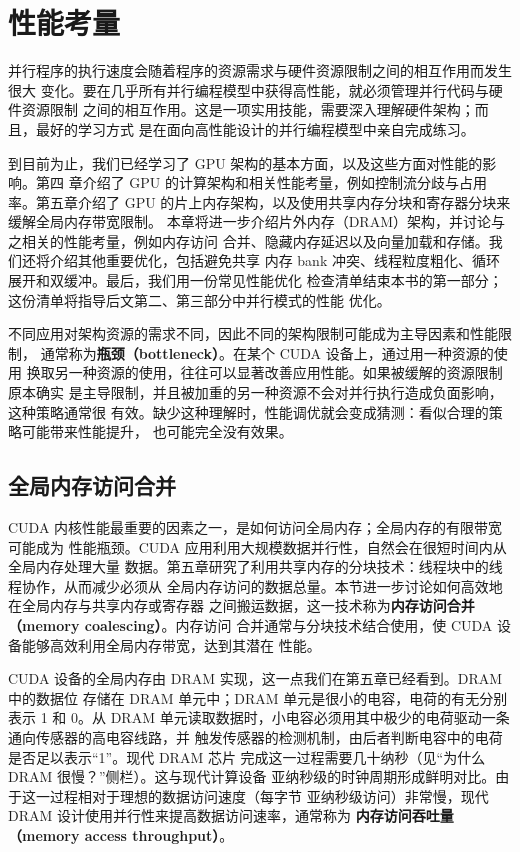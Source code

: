 \chapter{性能考量}
\label{chap:performance-considerations}
\chaptercontents

\setcounter{footnote}{0}

并行程序的执行速度会随着程序的资源需求与硬件资源限制之间的相互作用而发生很大
变化。要在几乎所有并行编程模型中获得高性能，就必须管理并行代码与硬件资源限制
之间的相互作用。这是一项实用技能，需要深入理解硬件架构；而且，最好的学习方式
是在面向高性能设计的并行编程模型中亲自完成练习。

到目前为止，我们已经学习了 GPU 架构的基本方面，以及这些方面对性能的影响。第四
章介绍了 GPU 的计算架构和相关性能考量，例如控制流分歧与占用率。第五章介绍了
GPU 的片上内存架构，以及使用共享内存分块和寄存器分块来缓解全局内存带宽限制。
本章将进一步介绍片外内存（DRAM）架构，并讨论与之相关的性能考量，例如内存访问
合并、隐藏内存延迟以及向量加载和存储。我们还将介绍其他重要优化，包括避免共享
内存 bank 冲突、线程粒度粗化、循环展开和双缓冲。最后，我们用一份常见性能优化
检查清单结束本书的第一部分；这份清单将指导后文第二、第三部分中并行模式的性能
优化。

不同应用对架构资源的需求不同，因此不同的架构限制可能成为主导因素和性能限制，
通常称为\textbf{瓶颈（bottleneck）}。在某个 CUDA 设备上，通过用一种资源的使用
换取另一种资源的使用，往往可以显著改善应用性能。如果被缓解的资源限制原本确实
是主导限制，并且被加重的另一种资源不会对并行执行造成负面影响，这种策略通常很
有效。缺少这种理解时，性能调优就会变成猜测：看似合理的策略可能带来性能提升，
也可能完全没有效果。

\section{全局内存访问合并}
\label{sec:global-memory-access-coalescing}

CUDA 内核性能最重要的因素之一，是如何访问全局内存；全局内存的有限带宽可能成为
性能瓶颈。CUDA 应用利用大规模数据并行性，自然会在很短时间内从全局内存处理大量
数据。第五章研究了利用共享内存的分块技术：线程块中的线程协作，从而减少必须从
全局内存访问的数据总量。本节进一步讨论如何高效地在全局内存与共享内存或寄存器
之间搬运数据，这一技术称为\textbf{内存访问合并（memory coalescing）}。内存访问
合并通常与分块技术结合使用，使 CUDA 设备能够高效利用全局内存带宽，达到其潜在
性能。

CUDA 设备的全局内存由 DRAM 实现，这一点我们在第五章已经看到。DRAM 中的数据位
存储在 DRAM 单元中；DRAM 单元是很小的电容，电荷的有无分别表示 1 和 0。从 DRAM
单元读取数据时，小电容必须用其中极少的电荷驱动一条通向传感器的高电容线路，并
触发传感器的检测机制，由后者判断电容中的电荷是否足以表示“1”。现代 DRAM 芯片
完成这一过程需要几十纳秒（见“为什么 DRAM 很慢？”侧栏）。这与现代计算设备
亚纳秒级的时钟周期形成鲜明对比。由于这一过程相对于理想的数据访问速度（每字节
亚纳秒级访问）非常慢，现代 DRAM 设计使用并行性来提高数据访问速率，通常称为
\textbf{内存访问吞吐量（memory access throughput）}。

